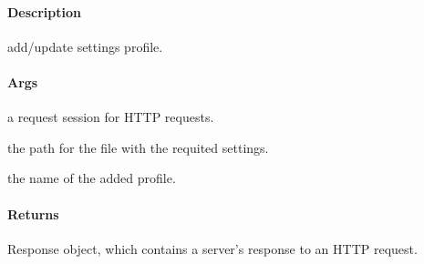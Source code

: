 \documentclass[letterpaper,10pt,english]{sphinxmanual}
\begin{document}
\begin{fulllineitems}
\label{\detokenize{gemini_perception_API:gemini_perception_API.add_perception_profile}}
\pysigstartsignatures
{}
\pysigstopsignatures

\paragraph{Description}
\label{\detokenize{gemini_perception_API:id1}}
\sphinxAtStartPar
add/update settings profile.


\paragraph{Args}
\label{\detokenize{gemini_perception_API:args}}\begin{description}
\sphinxAtStartPar
a request session for HTTP requests.

\sphinxAtStartPar
the path for the file with the requited settings.

\sphinxAtStartPar
the name of the added profile.

\end{description}


\paragraph{Returns}
\label{\detokenize{gemini_perception_API:returns}}\begin{description}
\sphinxAtStartPar
Response object, which contains a server’s response to an HTTP request.

\end{description}

\end{fulllineitems}

\end{document}
